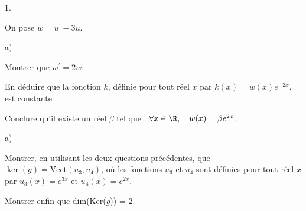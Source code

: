 \documentclass[11pt]{article}%
\begin{document}
\begin{noliste}{1.}
\item On pose $w = u^{\prime }-3u$.

\begin{noliste}{a)}
 \setlength{\itemsep}{2mm}
\item Montrer que $w^{\prime } = 2w$.

\item En déduire que la fonction $k$, définie pour tout réel $x$
par $k(x) = w(x)e^{-2x}$, est constante.

\item Conclure qu'il existe un réel $\beta $ tel que : $\forall x\in 
\R,\quad w(x) = \beta e^{2x}$.
\end{noliste}

\item 
\begin{noliste}{a)}
 \setlength{\itemsep}{2mm}
\item Montrer, en utilisant les deux questions précédentes, que $\ker
\left( g\right) = \mathrm{Vect}\left( u_{3},u_{4}\right) $, où les
fonctions $u_{3}$ et $u_{4}$ sont définies pour tout réel $x$ par
$u_{3}(x) = e^{3x}$ et $u_{4}(x) = e^{2x}$.

\item Montrer enfin que dim(Ker($g$)) = 2.
\end{noliste}
\end{noliste}

\label{fin}
\end{document}
